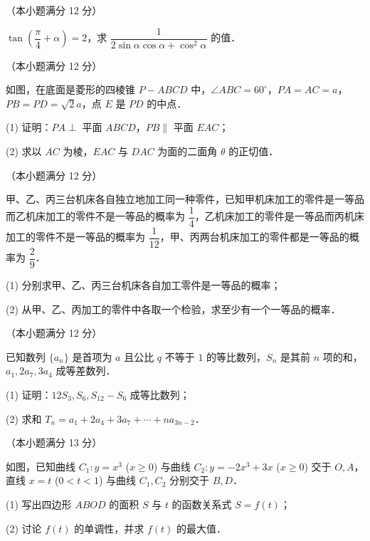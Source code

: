 \begin{question}
（本小题满分 12 分）

$\tan\left(\dfrac{\pi}{4} + \alpha\right) = 2$，求 $\dfrac{1}{2\sin\alpha\cos\alpha + \cos^2\alpha}$ 的值．

\Needspace{0.4\textheight}
\end{question}
\begin{question}
（本小题满分 12 分）

如图，在底面是菱形的四棱锥 $P - ABCD$ 中，$\angle ABC = 60^\circ$，$PA = AC = a$，$PB = PD = \sqrt{2}a$，点 $E$ 是 $PD$ 的中点．
\nopagebreak[4]
\begin{center}\end{center}
\nopagebreak[4]
(1) 证明：$PA \perp$ 平面 $ABCD$，$PB \parallel$ 平面 $EAC$；

(2) 求以 $AC$ 为棱，$EAC$ 与 $DAC$ 为面的二面角 $\theta$ 的正切值．

\end{question}
\begin{question}
（本小题满分 12 分）

甲、乙、丙三台机床各自独立地加工同一种零件，已知甲机床加工的零件是一等品而乙机床加工的零件不是一等品的概率为 $\dfrac{1}{4}$，乙机床加工的零件是一等品而丙机床加工的零件不是一等品的概率为 $\dfrac{1}{12}$，甲、丙两台机床加工的零件都是一等品的概率为 $\dfrac{2}{9}$．

(1) 分别求甲、乙、丙三台机床各自加工零件是一等品的概率；

(2) 从甲、乙、丙加工的零件中各取一个检验，求至少有一个一等品的概率．

\end{question}
\begin{question}
（本小题满分 12 分）

已知数列 $\{a_n\}$ 是首项为 $a$ 且公比 $q$ 不等于 $1$ 的等比数列，$S_n$ 是其前 $n$ 项的和，$a_1, 2a_7, 3a_4$ 成等差数列．

(1) 证明：$12S_3, S_6, S_{12} - S_6$ 成等比数列；

(2) 求和 $T_n = a_1 + 2a_4 + 3a_7 + \cdots + na_{3n-2}$．

\Needspace{0.4\textheight}
\end{question}
\begin{question}
（本小题满分 13 分）

如图，已知曲线 $C_1: y = x^3$ ($x \geqslant 0$) 与曲线 $C_2: y = -2x^3 + 3x$ ($x \geqslant 0$) 交于 $O, A$，直线 $x = t$ ($0 < t < 1$) 与曲线 $C_1, C_2$ 分别交于 $B, D$．
\nopagebreak[4]
\begin{center}\end{center}
\nopagebreak[4]
(1) 写出四边形 $ABOD$ 的面积 $S$ 与 $t$ 的函数关系式 $S = f(t)$；

(2) 讨论 $f(t)$ 的单调性，并求 $f(t)$ 的最大值．

\Needspace{0.4\textheight}
\end{question}
